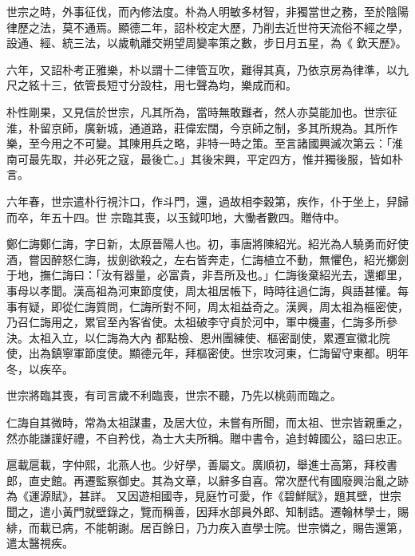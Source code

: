 \begin{pinyinscope}
 世宗之時，外事征伐，而內修法度。朴為人明敏多材智，非獨當世之務，至於陰陽律歷之法，莫不通焉。顯德二年，詔朴校定大歷，乃削去近世符天流俗不經之學，設通、經、統三法，以歲軌離交朔望周變率策之數，步日月五星，為《
 欽天歷》。



 六年，又詔朴考正雅樂，朴以謂十二律管互吹，難得其真，乃依京房為律準，以九尺之絃十三，依管長短寸分設柱，用七聲為均，樂成而和。



 朴性剛果，又見信於世宗，凡其所為，當時無敢難者，然人亦莫能加也。世宗征淮，朴留京師，廣新城，通道路，莊偉宏闊，今京師之制，多其所規為。其所作樂，至今用之不可變。其陳用兵之略，非特一時之策。至言諸國興滅次第云：「淮南可最先取，并必死之寇，最後亡。」其後宋興，平定四方，惟并獨後服，皆如朴言。



 六年春，世宗遣朴行視汴口，作斗門，還，過故相李穀第，疾作，仆于坐上，舁歸而卒，年五十四。世
 宗臨其喪，以玉鉞叩地，大慟者數四。贈侍中。



 鄭仁誨鄭仁誨，字日新，太原晉陽人也。初，事唐將陳紹光。紹光為人驍勇而好使酒，嘗因醉怒仁誨，拔劍欲殺之，左右皆奔走，仁誨植立不動，無懼色，紹光擲劍于地，撫仁誨曰：「汝有器量，必富貴，非吾所及也。」仁誨後棄紹光去，還鄉里，事母以孝聞。漢高祖為河東節度使，周太祖居帳下，時時往過仁誨，與語甚懽。每事有疑，即從仁誨質問，仁誨所對不阿，周太祖益奇之。漢興，周太祖為樞密使，乃召仁誨用之，累官至內客省使。太祖破李守貞於河中，軍中機畫，仁誨多所參決。太祖入立，以仁誨為大內
 都點檢、恩州團練使、樞密副使，累遷宣徽北院使，出為鎮寧軍節度使。顯德元年，拜樞密使。世宗攻河東，仁誨留守東都。明年冬，以疾卒。



 世宗將臨其喪，有司言歲不利臨喪，世宗不聽，乃先以桃荝而臨之。



 仁誨自其微時，常為太祖謀畫，及居大位，未嘗有所聞，而太祖、世宗皆親重之，然亦能謙謹好禮，不自矜伐，為士大夫所稱。贈中書令，追封韓國公，謚曰忠正。



 扈載扈載，字仲熙，北燕人也。少好學，善屬文。廣順初，舉進士高第，拜校書郎，直史館。再遷監察御史。其為文章，以辭多自喜。常次歷代有國廢興治亂之跡為《運源賦》，甚詳。
 又因遊相國寺，見庭竹可愛，作《碧鮮賦》，題其壁，世宗聞之，遣小黃門就壁錄之，覽而稱善，因拜水部員外郎、知制誥。遷翰林學士，賜緋，而載已病，不能朝謝。居百餘日，乃力疾入直學士院。世宗憐之，賜告還第，遣太醫視疾。




\end{pinyinscope}

